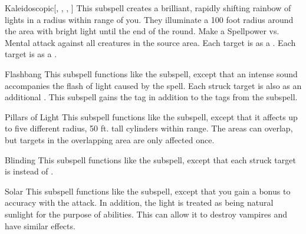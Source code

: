 \begin{ability}[\nth{3}]{Kaleidoscopic}[, , , ]
This subspell creates a brilliant, rapidly shifting rainbow of lights in a \areasmall radius within \rngmed range of you.
They illuminate a 100 foot radius around the area with bright light until the end of the round.
Make a Spellpower vs. Mental attack against all creatures in the source area.
\hit Each target is \disoriented as a .
\crit Each target is \confused as a .
\end{ability}
\vspace{0.25em}


\begin{ability}[\nth{4}]{Flashbang}
This subspell functions like the  subspell, except that an intense sound accompanies the flash of light caused by the spell.
Each struck target is also  as an additional .
This subspell gains the  tag in addition to the tags from the  subspell.
\end{ability}
\vspace{0.25em}


\begin{ability}[\nth{4}]{Pillars of Light}
This subspell functions like the  subspell, except that it affects up to five different \areasmall radius, 50 ft. tall cylinders within range.
The areas can overlap, but targets in the overlapping area are only affected once.
\end{ability}
\vspace{0.25em}


\begin{ability}[\nth{5}]{Blinding}
This subspell functions like the  subspell, except that each struck target is  instead of .
\end{ability}
\vspace{0.25em}


\begin{ability}[\nth{6}]{Solar}
This subspell functions like the  subspell, except that you gain a  bonus to accuracy with the attack.
In addition, the light is treated as being natural sunlight for the purpose of abilities.
This can allow it to destroy vampires and have similar effects.
\end{ability}
\vspace{0.25em}

